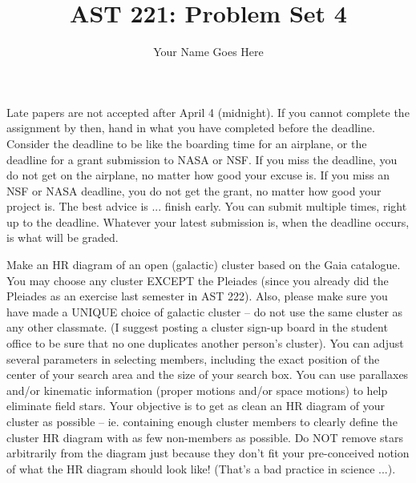 \documentclass[12pt]{article}
\newenvironment{problem}[2][Problem]{\begin{trivlist}
\item[\hskip \labelsep {\bfseries #1}\hskip \labelsep {\bfseries #2.}]}{\end{trivlist}}
\begin{document}
 
 
\title{AST 221: Problem Set 4}
\author{Your Name Goes Here}
\maketitle

 Late papers are not accepted after April 4 (midnight). If you cannot complete the assignment by then, hand in what you have completed before the deadline. Consider the deadline to be like the boarding time for an airplane, or the deadline for a grant submission to NASA or NSF. If you miss the deadline, you do not get on the airplane, no matter how good your excuse is. If you miss an NSF or NASA deadline, you do not get the grant, no matter how good your project is. The best advice is ... finish early. You can submit multiple times, right up to the deadline. Whatever your latest submission is, when the deadline occurs, is what will be graded.
 
\begin{problem}{1} Make an HR diagram of an open (galactic) cluster based on the Gaia catalogue. You may choose any cluster EXCEPT the Pleiades (since you already did the Pleiades as an exercise last semester in AST 222). Also, please make sure you have made a UNIQUE choice of galactic cluster -- do not use the same cluster as any other classmate. (I suggest posting a cluster sign-up board in the student office to be sure that no one duplicates another person's cluster). You can adjust several parameters in selecting members, including the exact position of the center of your search area and the size of your search box. You can use parallaxes and/or kinematic information (proper motions and/or space motions) to help eliminate field stars. Your objective is to get as clean an HR diagram of your cluster as possible -- ie. containing enough cluster members to clearly define the cluster HR diagram with as few non-members as possible. Do NOT remove stars arbitrarily from the diagram just because they don't fit your pre-conceived notion of what the HR diagram should look like! (That's a bad practice in science ...). 

\end{problem}
\end{document}
